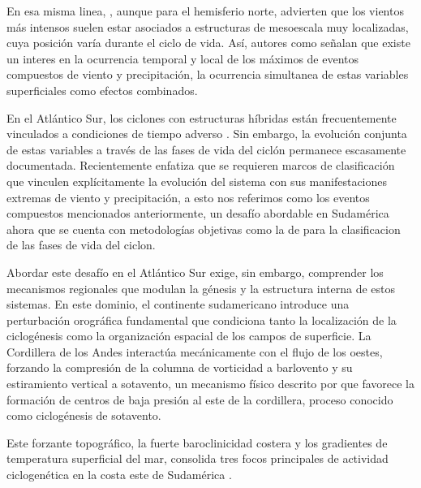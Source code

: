 En esa misma linea, \citet{eisenstein2023identification}, aunque para el hemisferio norte, advierten que los vientos más intensos suelen estar asociados a estructuras de mesoescala muy localizadas, cuya posición varía durante el ciclo de vida. Así, autores como \citet{zscheischler2018future} señalan que existe un interes en la ocurrencia temporal y local de los máximos de eventos compuestos de viento y precipitación, la ocurrencia simultanea de estas variables superficiales como efectos combinados. 

En el Atlántico Sur, los ciclones con estructuras híbridas están frecuentemente vinculados a condiciones de tiempo adverso \citep{marrafon2022classificacao}. Sin embargo, la evolución conjunta de estas variables a través de las fases de vida del ciclón permanece escasamente documentada. Recientemente \citet{han2025system} enfatiza que se requieren marcos de clasificación que vinculen explícitamente la evolución del sistema con sus manifestaciones extremas de viento y precipitación, a esto nos referimos como los eventos compuestos mencionados anteriormente, un desafío abordable en Sudamérica ahora que se cuenta con metodologías objetivas como la de \citet{coutodesouza2024new} para la clasificacion de las fases de vida del ciclon.


Abordar este desafío en el Atlántico Sur exige, sin embargo, comprender los mecanismos regionales que modulan la génesis y la estructura interna de estos sistemas. En este dominio, el continente sudamericano introduce una perturbación orográfica fundamental que condiciona tanto la localización de la ciclogénesis como la organización espacial de los campos de superficie. La Cordillera de los Andes interactúa mecánicamente con el flujo de los oestes, forzando la compresión de la columna de vorticidad a barlovento y su estiramiento vertical a sotavento, un mecanismo físico descrito por \citet{gan1994influence} que favorece la formación de centros de baja presión al este de la cordillera, proceso conocido como ciclogénesis de sotavento.

Este forzante topográfico, la fuerte baroclinicidad costera y los gradientes de temperatura superficial del mar, consolida tres focos principales de actividad ciclogenética en la costa este de Sudamérica \citep{reboita2026meteorology}. 

